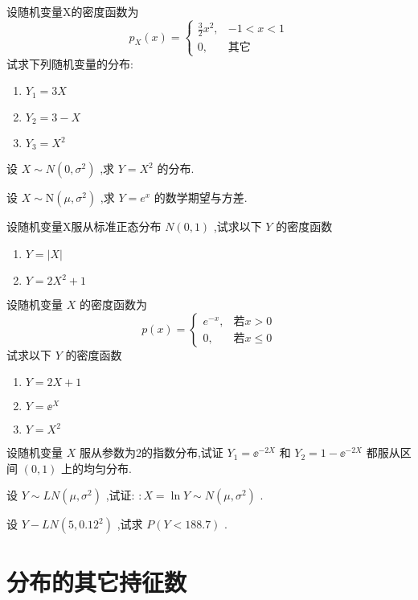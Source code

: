 \begin{xiti}
\item 设随机变量X的密度函数为
\[
p_{X}(x)=\left\{
\begin{array}{ll}
{\frac{3}{2} x^{2},} & {-1<x<1} \\ 
{0,} & {\text{其它}}
\end{array}\right.
\]
试求下列随机变量的分布:
\begin{enumerate}
	\item $ Y_{1}=3 X $ 
	\item $ Y_{2}=3-X $ 
	\item $ Y_{3}=X^{2} $ 
\end{enumerate}
\item 设 $ X \sim N\left(0, \sigma^{2}\right) $ ,求 $ Y=X^{2} $ 的分布.
\item 设 $ X \sim \mathrm{N}\left(\mu, \sigma^{2}\right) $ ,求 $ Y=e^{x} $ 的数学期望与方差.
\item 设随机变量X服从标准正态分布 $ N(0,1) $ ,试求以下 $ Y $ 的密度函数
\begin{enumerate}
	\item $ Y=|X| $ 
	\item $ Y=2 X^{2}+1 $ 
\end{enumerate}
\item 设随机变量 $ X $ 的密度函数为
\[
p(x)=\left\{
\begin{array}{ll}
{e^{-x},} & {\text{若} x>0} \\ 
{0,} & {\text{若} x \leqslant 0}
\end{array}\right.
\]
试求以下 $ Y $ 的密度函数
\begin{enumerate}
	\item $ Y=2 X+1 $ 
	\item $ Y=\ee ^{X} $ 
	\item $ Y=X^{2} $ 
\end{enumerate}
\item 设随机变量 $ X $ 服从参数为2的指数分布,试证 $ Y_{1}=\ee ^{-2 X} $ 和 $ Y_{2}=1-\ee ^{-2 X} $ 都服从区间 $ (0,1) $ 上的均匀分布.
\item 设 $ Y \sim L N\left(\mu, \sigma^{2}\right) $ ,试证: $ : X=\ln Y \sim N\left(\mu, \sigma^{2}\right) $ .
\item 设 $ Y-L N\left(5,0.12^{2}\right) $ ,试求 $ P(Y<188.7) $ .
\end{xiti}

\section{分布的其它持征数}\label{sec:2.7}

